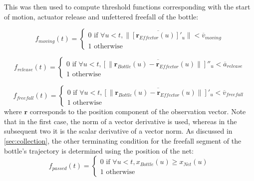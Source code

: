 \documentclass{article}
\begin{document}
This was then used to compute threshold functions corresponding with the start of motion, actuator release and unfettered freefall of the bottle:

\begin{equation}
    f_{moving} (t) = \begin{cases}
        0 \text{ if } \forall u < t,  \lVert \overline{\left [  \boldsymbol{r}_{Effector}(u) \right ]'_u} \rVert  < \overline{v}_{moving} \\
        1 \text{ otherwise }
    \end{cases}
\end{equation}

\begin{equation}
    f_{release} (t) = \begin{cases}
        0 \text{ if } \forall u < t, \overline{ \left [ \lVert  \boldsymbol{r}_{Bottle}(u) -  \boldsymbol{r}_{Effector}(u)  \rVert \right ] ''_u} < \overline{a}_{release} \\
        1 \text{ otherwise }
    \end{cases}
\end{equation}

\begin{equation}
    f_{freefall} (t) = \begin{cases}
        0 \text{ if } \forall u < t,  \overline{ \left [ \lVert  \boldsymbol{r}_{Bottle}(u) -  \boldsymbol{r}_{Effector}(u)  \rVert \right ] '_u} < \overline{v}_{freefall} \\
        1 \text{ otherwise }
    \end{cases}
\end{equation}
where $\boldsymbol{r}$ corresponds to the position component of the observation vector. Note that in the first case, the norm of a vector derivative is used, whereas in the subsequent two it is the scalar derivative of a vector norm. As discussed in \ref{sec:collection}, the other terminating condition for the freefall segment of the bottle's trajectory is determined using the position of the net:
\begin{equation}
    f_{passed} (t) = \begin{cases}
        0 \text{ if } \forall u < t, x_{Bottle}(u) \geq x_{Net}(u) \\
        1 \text{ otherwise }
    \end{cases}
\end{equation}
\end{document}
